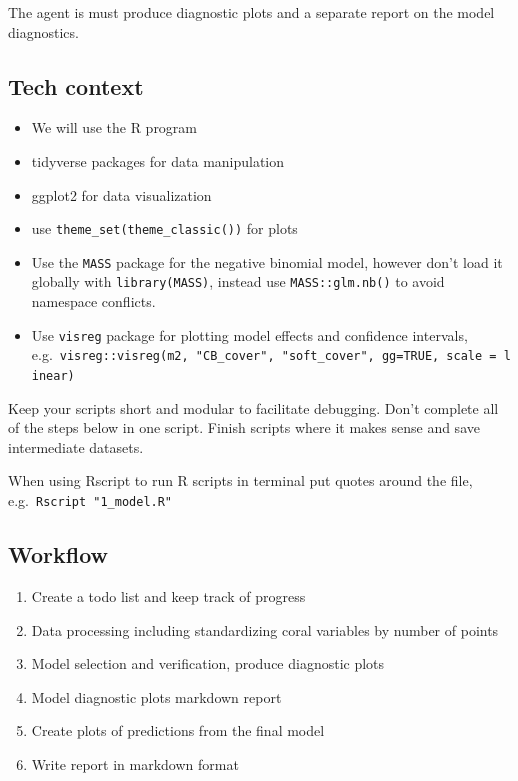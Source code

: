 \documentclass[
  letterpaper,
  DIV=11,
  numbers=noendperiod]{scrreprt}
\providecommand{\tightlist}{%
  \setlength{\itemsep}{0pt}\setlength{\parskip}{0pt}}\usepackage{longtable,booktabs,array}
\begin{document}
\begin{tcolorbox}
The agent is must produce diagnostic plots and a separate report on the
model diagnostics.

\subsection{Tech context}\label{tech-context}

\begin{itemize}
\tightlist
\item
  We will use the R program
\item
  tidyverse packages for data manipulation
\item
  ggplot2 for data visualization
\item
  use \texttt{theme\_set(theme\_classic())} for plots
\item
  Use the \texttt{MASS} package for the negative binomial model, however
  don't load it globally with \texttt{library(MASS)}, instead use
  \texttt{MASS::glm.nb()} to avoid namespace conflicts.
\item
  Use \texttt{visreg} package for plotting model effects and confidence
  intervals,
  e.g.~\texttt{visreg::visreg(m2,\ "CB\_cover",\ "soft\_cover",\ gg=TRUE,\ scale\ =\ \textquotesingle{}linear\textquotesingle{})}
\end{itemize}

Keep your scripts short and modular to facilitate debugging. Don't
complete all of the steps below in one script. Finish scripts where it
makes sense and save intermediate datasets.

When using Rscript to run R scripts in terminal put quotes around the
file, e.g.~\texttt{Rscript\ "1\_model.R"}

\subsection{Workflow}\label{workflow}

\begin{enumerate}
\def\labelenumi{\arabic{enumi}.}
\tightlist
\item
  Create a todo list and keep track of progress
\item
  Data processing including standardizing coral variables by number of
  points
\item
  Model selection and verification, produce diagnostic plots
\item
  Model diagnostic plots markdown report
\item
  Create plots of predictions from the final model
\item
  Write report in markdown format
\end{enumerate}


\end{tcolorbox}
\end{document}
